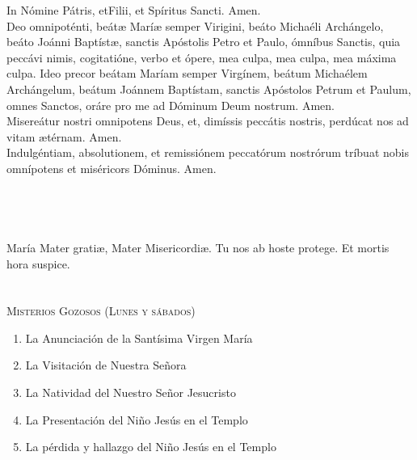 \documentclass[9pt]{article}
\date{Valladolid (España), \monthyeardate\today}
\begin{document}
\begin{multicols*}{2}

    In Nómine Pátris, et{\redcross}Filii, et Spíritus Sancti. Amen.\\

     Deo omnipoténti, beát{\ae} Marí{\ae} semper Virigini, beáto Michaéli Archángelo, beáto Joánni Baptíst{\ae}, 
    sanctis Apóstolis Petro et Paulo, ómníbus Sanctis, quia peccávi nimis, cogitatióne, verbo et ópere, mea culpa, mea culpa, 
    mea máxima culpa. Ideo precor beátam     Maríam semper Virgínem, beátum Michaélem Archángelum, beátum Joánnem Baptístam, 
    sanctis Apóstolos Petrum et Paulum, omnes Sanctos, oráre pro me ad Dóminum Deum nostrum. Amen.\\
    Misereátur nostri omnipotens Deus, et, dimíssis peccátis nostris, perdúcat nos ad vitam {\ae}térnam. Amen.\\
    Indulgéntiam, absolutionem, et remissiónem peccatórum nostrórum tríbuat nobis omnípotens et miséricors Dóminus. Amen.\\

    \\
    \\
    \\\\
    María Mater grati{\ae}, Mater Misericordi{\ae}. Tu nos ab hoste protege. Et mortis hora suspice.\\
    
    \\

    \small{}\\
    \textsc{Misterios Gozosos (Lunes y sábados)}
    \begin{enumerate}
        \item La Anunciación de la Santísima Virgen María
        \item La Visitación de Nuestra Señora
        \item La Natividad del Nuestro Señor Jesucristo
        \item La Presentación del Niño Jesús en el Templo
        \item La pérdida y hallazgo del Niño Jesús en el Templo
    \end{enumerate}


\end{multicols*}
\end{document}
